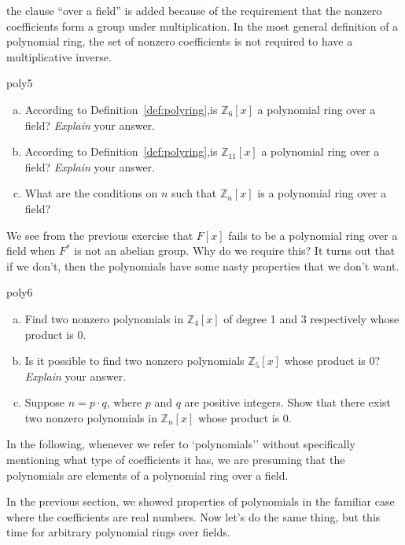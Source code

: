 \begin{rem}
the clause ``over a field'' is added because of the requirement that the  nonzero coefficients form a group under multiplication. In the most general definition of a polynomial ring, the set of nonzero coefficients is not required to have a multiplicative inverse.
\end{rem}

\begin{exercise}{poly5}
\begin{enumerate}[(a)]
\item
According to Definition~\ref{def:polyring},is $\mathbb{Z}_6[x]$ a polynomial ring over a field? \emph{Explain} your answer.
\item
According to Definition~\ref{def:polyring},is $\mathbb{Z}_{11}[x]$ a polynomial ring over a field? \emph{Explain} your answer.
\item
What are the conditions on $n$ such that $\mathbb{Z}_n[x]$ is a polynomial ring over a field?
\end{enumerate}
\end{exercise}
We see from the previous exercise that $F[x]$ fails to be a polynomial ring over a field when $F^*$ is not an abelian group. Why do we require this? It turns out that if we don't, then the polynomials have some nasty properties that we don't want.

\begin{exercise}{poly6}
\begin{enumerate}[(a)]
\item
Find two nonzero polynomials in $\mathbb{Z}_4[x]$ of degree 1 and 3 respectively  whose product is 0.
\item
Is it possible to find two nonzero polynomials $\mathbb{Z}_5[x]$ whose product is 0? \emph{Explain} your answer.
\item
Suppose $n=p\cdot q$, where $p$ and $q$ are positive integers. Show that there exist two nonzero polynomials in $\mathbb{Z}_n[x]$ whose product is 0.
\end{enumerate}
\end{exercise}

\begin{rem}
In the following, whenever we refer to `polynomials'' without specifically mentioning what type of coefficients it has, we are presuming that the polynomials are elements of a polynomial ring over a field.
\end{rem}


In the previous section, we showed properties of polynomials in the familiar case where the coefficients are real numbers. Now let's 
do the same thing, but this time for arbitrary polynomial rings over fields.
 
